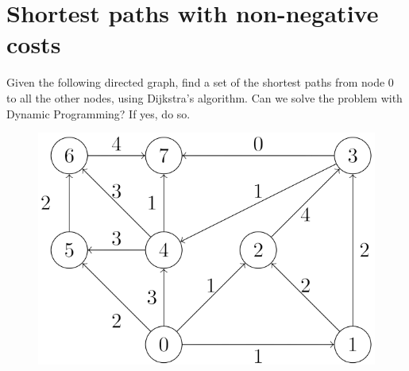 \documentclass[12pt, a4paper]{report}
\begin{document}
    \section{Shortest paths with non-negative costs}
        Given the following directed graph, find a set of the shortest paths from node 0 to all the other nodes, using Dijkstra's algorithm. Can we solve the problem with Dynamic 
        Programming? If yes, do so.
        \begin{figure}[H]
            \centering
            \includegraphics[width=0.5\linewidth]{images/dijk.png}
        \end{figure}
\end{document}
